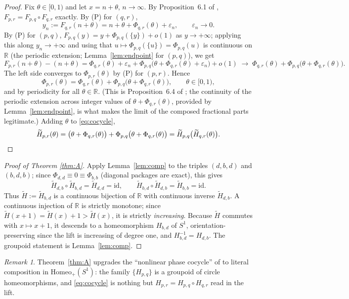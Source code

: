 \documentclass[11pt]{article}
\theoremstyle{definition}
\theoremstyle{remark}
\newtheorem{remark}[theorem]{Remark}
\newcommand{\R}{\mathbb{R}}
\newcommand{\Sone}{S^{1}}
\newcommand{\frc}[1]{\{#1\}}
\newcommand{\Ht}{\widetilde H}
\begin{document}
\begin{proof}
Fix $\theta\in[0,1)$ and let $x=n+\theta$, $n\to\infty$. By
Proposition~6.1 of \cite{J}, $F_{p,r}=F_{p,q}\circ F_{q,r}$ exactly. By
(P) for $(q,r)$,
\[
y_n:=F_{q,r}(n+\theta)=n+\theta+\Phi_{q,r}(\theta)+\varepsilon_n,
\qquad \varepsilon_n\to0 .
\]
By (P) for $(p,q)$, $F_{p,q}(y)=y+\Phi_{p,q}(\frc y)+o(1)$ as
$y\to+\infty$; applying this along $y_n\to+\infty$ and using that
$u\mapsto\Phi_{p,q}(\frc u)=\Phi_{p,q}(u)$ is continuous on $\R$ (the
periodic extension; Lemma~\ref{lem:endpoint} for $(p,q)$), we get
\[
F_{p,r}(n+\theta)-(n+\theta)
=\Phi_{q,r}(\theta)+\varepsilon_n
+\Phi_{p,q}\big(\theta+\Phi_{q,r}(\theta)+\varepsilon_n\big)+o(1)
\;\longrightarrow\;
\Phi_{q,r}(\theta)+\Phi_{p,q}\big(\theta+\Phi_{q,r}(\theta)\big).
\]
The left side converges to $\Phi_{p,r}(\theta)$ by (P) for $(p,r)$. Hence
\begin{equation}\label{eq:cocycle}
\Phi_{p,r}(\theta)=\Phi_{q,r}(\theta)
+\Phi_{p,q}\big(\theta+\Phi_{q,r}(\theta)\big),
\qquad\theta\in[0,1),
\end{equation}
and by periodicity for all $\theta\in\R$. (This is Proposition~6.4 of
\cite{J}; the continuity of the periodic extension across integer values
of $\theta+\Phi_{q,r}(\theta)$, provided by Lemma~\ref{lem:endpoint}, is
what makes the limit of the composed fractional parts legitimate.)
Adding $\theta$ to \eqref{eq:cocycle},
\[
\Ht_{p,r}(\theta)
=\big(\theta+\Phi_{q,r}(\theta)\big)
+\Phi_{p,q}\big(\theta+\Phi_{q,r}(\theta)\big)
=\Ht_{p,q}\big(\Ht_{q,r}(\theta)\big).
\qedhere
\]
\end{proof}

\begin{proof}[Proof of Theorem \textup{\ref{thm:A}}]
Apply Lemma~\ref{lem:comp} to the triples $(d,b,d)$ and $(b,d,b)$; since
$\Phi_{d,d}\equiv0\equiv\Phi_{b,b}$ (diagonal packages are exact), this
gives
\[
\Ht_{d,b}\circ\Ht_{b,d}=\Ht_{d,d}=\mathrm{id},
\qquad
\Ht_{b,d}\circ\Ht_{d,b}=\Ht_{b,b}=\mathrm{id}.
\]
Thus $\Ht:=\Ht_{b,d}$ is a continuous bijection of $\R$ with continuous
inverse $\Ht_{d,b}$. A continuous injection of $\R$ is strictly
monotone; since $\Ht(x+1)=\Ht(x)+1>\Ht(x)$, it is strictly
\emph{increasing}. Because $\Ht$ commutes with $x\mapsto x+1$, it descends
to a homeomorphism $H_{b,d}$ of $\Sone$, orientation-preserving since the
lift is increasing of degree one, and $H_{b,d}^{-1}=H_{d,b}$. The groupoid
statement is Lemma~\ref{lem:comp}.
\end{proof}

\begin{remark}
Theorem~\ref{thm:A} upgrades the ``nonlinear phase cocycle'' of
\cite[Prop.~6.4]{J} to literal composition in
$\mathrm{Homeo}_{+}(\Sone)$: the family
$\{H_{p,q}\}$ is a groupoid of circle homeomorphisms, and
\eqref{eq:cocycle} is nothing but $H_{p,r}=H_{p,q}\circ H_{q,r}$ read in
the lift.
\end{remark}
\end{document}
